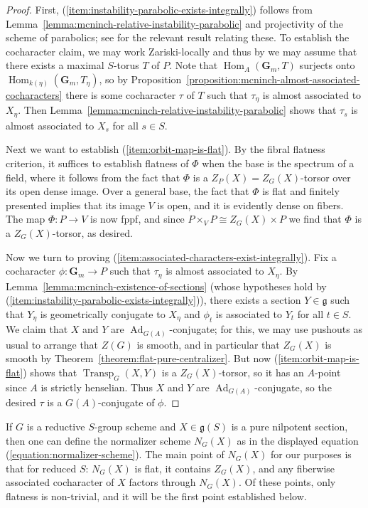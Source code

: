 \documentclass[11pt,reqno]{amsart}
\theoremstyle{definition}
\newcommand{\bG}{{\mathbf G}}
\newcommand{\fg}{\mathfrak{g}}
\DeclareMathOperator{\Ad}{Ad}
\DeclareMathOperator{\Hom}{Hom}
\DeclareMathOperator{\Transp}{Transp}
\begin{document}
\begin{proof}
First, (\ref{item:instability-parabolic-exists-integrally}) follows from Lemma~\ref{lemma:mcninch-relative-instability-parabolic} and projectivity of the scheme of parabolics; see \cite[2.6.3]{McNinch-relative-centralizer} for the relevant result relating these. To establish the cocharacter claim, we may work Zariski-locally and thus by \cite[Exp.\ XIV, Cor.\ 3.20, Rmk.\ 3.21]{SGA3} we may assume that there exists a maximal $S$-torus $T$ of $P$. Note that $\Hom_A(\bG_m, T)$ surjects onto $\Hom_{k(\eta)}(\bG_m, T_\eta)$, so by Proposition~\ref{proposition:mcninch-almost-associated-cocharacters} there is some cocharacter $\tau$ of $T$ such that $\tau_\eta$ is almost associated to $X_\eta$. Then Lemma~\ref{lemma:mcninch-relative-instability-parabolic} shows that $\tau_s$ is almost associated to $X_s$ for all $s \in S$. \smallskip

Next we want to establish (\ref{item:orbit-map-is-flat}). By the fibral flatness criterion, it suffices to establish flatness of $\Phi$ when the base is the spectrum of a field, where it follows from the fact that $\Phi$ is a $Z_P(X) = Z_G(X)$-torsor over its open dense image. Over a general base, the fact that $\Phi$ is flat and finitely presented implies that its image $V$ is open, and it is evidently dense on fibers. The map $\Phi: P \to V$ is now fppf, and since $P \times_V P \cong Z_G(X) \times P$ we find that $\Phi$ is a $Z_G(X)$-torsor, as desired. \smallskip

Now we turn to proving (\ref{item:associated-characters-exist-integrally}). Fix a cocharacter $\phi: \bG_m \to P$ such that $\tau_\eta$ is almost associated to $X_\eta$. By Lemma~\ref{lemma:mcninch-existence-of-sections} (whose hypotheses hold by (\ref{item:instability-parabolic-exists-integrally})), there exists a section $Y \in \fg$ such that $Y_\eta$ is geometrically conjugate to $X_\eta$ and $\phi_t$ is associated to $Y_t$ for all $t \in S$. We claim that $X$ and $Y$ are $\Ad_{G(A)}$-conjugate; for this, we may use pushouts as usual to arrange that $Z(G)$ is smooth, and in particular that $Z_G(X)$ is smooth by Theorem~\ref{theorem:flat-pure-centralizer}. But now (\ref{item:orbit-map-is-flat}) shows that $\Transp_G(X, Y)$ is a $Z_G(X)$-torsor, so it has an $A$-point since $A$ is strictly henselian. Thus $X$ and $Y$ are $\Ad_{G(A)}$-conjugate, so the desired $\tau$ is a $G(A)$-conjugate of $\phi$.
\end{proof}

If $G$ is a reductive $S$-group scheme and $X \in \fg(S)$ is a pure nilpotent section, then one can define the normalizer scheme $N_G(X)$ as in the displayed equation (\ref{equation:normalizer-scheme}). The main point of $N_G(X)$ for our purposes is that for reduced $S$: $N_G(X)$ is flat, it contains $Z_G(X)$, and any fiberwise associated cocharacter of $X$ factors through $N_G(X)$. Of these points, only flatness is non-trivial, and it will be the first point established below.
\end{document}
